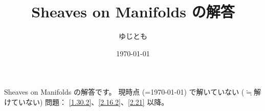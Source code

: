 \documentclass[uplatex,dvipdfmx]{jsarticle}
\begin{document}
\title{Sheaves on Manifolds \KStitle の解答}
\author{ゆじとも}
\date{\today}
\maketitle

Sheaves on Manifolds \cite[\KStitle]{kashiwara2002sheaves}の解答です。
現時点 (=\today) で解いていない (\(\fallingdotseq\)解けていない) 問題：
\autoref{1.30.2}、\autoref{2.16.2}、\autoref{2.21} 以降。
\HeaderKS
{}


\printbibliography
\end{document}
